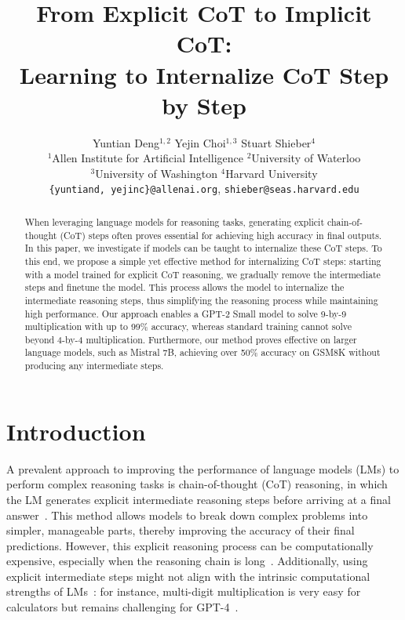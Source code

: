 \documentclass{article}
\title{From Explicit CoT to Implicit CoT: \\Learning to Internalize CoT Step by Step}
\author{%
Yuntian Deng$^{1,2}$ \quad  Yejin Choi$^{1,3}$ \quad Stuart Shieber$^4$\\
$^{1}$Allen Institute for Artificial Intelligence \quad $^{2}$University of Waterloo \\ $^{3}$University of Washington \quad
$^{4}$Harvard University\\
\texttt{\{yuntiand, yejinc\}@allenai.org}, \texttt{shieber@seas.harvard.edu} }
\begin{document}
\maketitle

\begin{abstract}
When leveraging language models for reasoning tasks, generating explicit chain-of-thought (CoT) steps often proves essential for achieving high accuracy in final outputs. In this paper, we investigate if models can be taught to internalize these CoT steps. To this end, we propose a simple yet effective method for internalizing CoT steps: starting with a model trained for explicit CoT reasoning, we gradually remove the intermediate steps and finetune the model. This process allows the model to internalize the intermediate reasoning steps, thus simplifying the reasoning process while maintaining high performance. Our approach enables a GPT-2 Small model to solve 9-by-9 multiplication with up to 99\% accuracy, whereas standard training cannot solve beyond 4-by-4 multiplication. Furthermore, our method proves effective on larger language models, such as Mistral 7B, achieving over 50\% accuracy on GSM8K without producing any intermediate steps.
\end{abstract}


\section{Introduction}
A prevalent approach to improving the performance of language models (LMs) to perform complex reasoning tasks is chain-of-thought (CoT) reasoning, in which the LM generates explicit intermediate reasoning steps before arriving at a final answer~\citep{nye2021work,wei2022chain}. This method allows models to break down complex problems into simpler, manageable parts, thereby improving the accuracy of their final predictions. However, this explicit reasoning process can be computationally expensive, especially when the reasoning chain is long~\citep{deng2023implicit}. Additionally, using explicit intermediate steps might not align with the intrinsic computational strengths of LMs~\citep{lehnert2024a}: for instance, multi-digit multiplication is very easy for calculators but remains challenging for GPT-4~\citep{yang2023gpt}.
\end{document}
